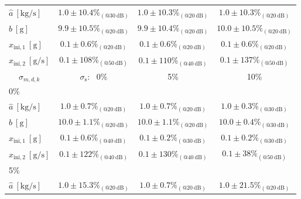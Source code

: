 {{\begin{table}[h!]
\begin{tabular}{c| c c c}
 \multicolumn{1}{l|}{\hspace{2mm} $\widehat{a} \ \mathrm{[kg/s]}$} & $1.0 \pm 10.4 \%_{(@30 \ \mathrm{dB})}$ & $1.0 \pm 10.3 \%_{(@20 \ \mathrm{dB})}$ & $1.0 \pm 10.3 \%_{(@20 \ \mathrm{dB})}$ \\ 
 \multicolumn{1}{l|}{\hspace{2mm} $\widehat{b} \ \mathrm{[g]}$} & $9.9 \pm 10.5 \%_{(@20 \ \mathrm{dB})}$ & $9.9 \pm 10.4 \%_{(@20 \ \mathrm{dB})}$ & $10.0 \pm 10.5 \%_{(@20 \ \mathrm{dB})}$ \\ 
\multicolumn{1}{l|}{\hspace{2mm} $\widehat{x}_{\mathrm{ini,1}} \ \mathrm{[g]}$} & $0.1 \pm 0.6 \%_{(@20 \ \mathrm{dB})}$ & $0.1 \pm 0.6 \%_{(@20 \ \mathrm{dB})}$ & $0.1 \pm 0.6 \%_{(@20 \ \mathrm{dB})}$ \\
 \multicolumn{1}{l|}{\hspace{2mm} $\widehat{x}_{\mathrm{ini,2}} \ \mathrm{[g/s]}$} & $0.1 \pm 108 \%_{(@50 \ \mathrm{dB})}$ & $0.1 \pm 110 \%_{(@40 \ \mathrm{dB})}$ & $0.1 \pm 137 \%_{(@50 \ \mathrm{dB})}$ \\ 
 \hline
 $\sigma_{{m},{d},{k}}$ & $\sigma_{\mathrm{s}}$: \ 0\% & 5\% & 10\% \\
 \hline
 \multicolumn{1}{l|}{0\%} \\
 \multicolumn{1}{l|}{\hspace{2mm} $\widehat{a} \ \mathrm{[kg/s]}$} & $1.0 \pm 0.7 \%_{(@20 \ \mathrm{dB})}$ &  $1.0 \pm 0.7 \%_{(@20 \ \mathrm{dB})}$ & $1.0 \pm 0.3 \%_{(@30 \ \mathrm{dB})}$ \\ 
 \multicolumn{1}{l|}{\hspace{2mm} $\widehat{b} \ \mathrm{[g]}$} & $10.0 \pm 1.1 \%_{(@20 \ \mathrm{dB})}$ & $10.0 \pm 1.1 \%_{(@20 \ \mathrm{dB})}$ & $10.0 \pm 0.4 \%_{(@30 \ \mathrm{dB})}$ \\ 
 \multicolumn{1}{l|}{\hspace{2mm} $\widehat{x}_{\mathrm{ini,1}} \ \mathrm{[g]}$} & $0.1 \pm 0.6 \%_{(@40 \ \mathrm{dB})}$ & $0.1 \pm 0.2 \%_{(@30 \ \mathrm{dB})}$ & $0.1 \pm 0.2 \%_{(@30 \ \mathrm{dB})}$ \\
 \multicolumn{1}{l|}{\hspace{2mm} $\widehat{x}_{\mathrm{ini,2}} \ \mathrm{[g/s]}$} & $0.1 \pm 122 \%_{(@40 \ \mathrm{dB})}$ & $0.1 \pm 130 \%_{(@40 \ \mathrm{dB})}$ & $0.1 \pm 38 \%_{(@50 \ \mathrm{dB})}$ \\
 \multicolumn{1}{l|}{5\%} \\
 \multicolumn{1}{l|}{\hspace{2mm} $\widehat{a} \ \mathrm{[kg/s]}$} & $1.0 \pm 15.3 \%_{(@20 \ \mathrm{dB})}$ & $1.0 \pm 0.7 \%_{(@20 \ \mathrm{dB})}$ & $1.0 \pm 21.5 \%_{(@20 \ \mathrm{dB})}$ \\  

\end{tabular}
\end{table}}}

